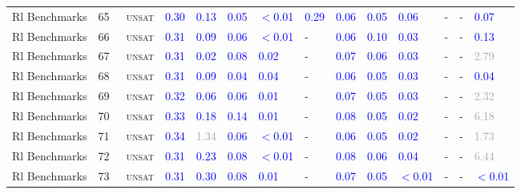 \begin{center}
{\begin{longtable}{@{}llllllllllllll@{}}
Rl Benchmarks & 65 & ~\textsc{unsat} & \textcolor{blue}{0.30} & \textcolor{blue}{0.13} & \textcolor{blue}{0.05} & \textcolor{blue}{$<$0.01} & \textcolor{blue}{0.29} & \textcolor{blue}{0.06} & \textcolor{blue}{0.05} & \textcolor{blue}{0.06} & - & - & \textcolor{blue}{0.07} \\
Rl Benchmarks & 66 & ~\textsc{unsat} & \textcolor{blue}{0.31} & \textcolor{blue}{0.09} & \textcolor{blue}{0.06} & \textcolor{blue}{$<$0.01} & - & \textcolor{blue}{0.06} & \textcolor{blue}{0.10} & \textcolor{blue}{0.03} & - & - & \textcolor{blue}{0.13} \\
Rl Benchmarks & 67 & ~\textsc{unsat} & \textcolor{blue}{0.31} & \textcolor{blue}{0.02} & \textcolor{blue}{0.08} & \textcolor{blue}{0.02} & - & \textcolor{blue}{0.07} & \textcolor{blue}{0.06} & \textcolor{blue}{0.03} & - & - & \textcolor{darkgray}{2.79} \\
Rl Benchmarks & 68 & ~\textsc{unsat} & \textcolor{blue}{0.31} & \textcolor{blue}{0.09} & \textcolor{blue}{0.04} & \textcolor{blue}{0.04} & - & \textcolor{blue}{0.06} & \textcolor{blue}{0.05} & \textcolor{blue}{0.03} & - & - & \textcolor{blue}{0.04} \\
Rl Benchmarks & 69 & ~\textsc{unsat} & \textcolor{blue}{0.32} & \textcolor{blue}{0.06} & \textcolor{blue}{0.06} & \textcolor{blue}{0.01} & - & \textcolor{blue}{0.07} & \textcolor{blue}{0.05} & \textcolor{blue}{0.03} & - & - & \textcolor{darkgray}{2.32} \\
Rl Benchmarks & 70 & ~\textsc{unsat} & \textcolor{blue}{0.33} & \textcolor{blue}{0.18} & \textcolor{blue}{0.14} & \textcolor{blue}{0.01} & - & \textcolor{blue}{0.08} & \textcolor{blue}{0.05} & \textcolor{blue}{0.02} & - & - & \textcolor{darkgray}{6.18} \\
Rl Benchmarks & 71 & ~\textsc{unsat} & \textcolor{blue}{0.34} & \textcolor{darkgray}{1.34} & \textcolor{blue}{0.06} & \textcolor{blue}{$<$0.01} & - & \textcolor{blue}{0.06} & \textcolor{blue}{0.05} & \textcolor{blue}{0.02} & - & - & \textcolor{darkgray}{1.73} \\
Rl Benchmarks & 72 & ~\textsc{unsat} & \textcolor{blue}{0.31} & \textcolor{blue}{0.23} & \textcolor{blue}{0.08} & \textcolor{blue}{$<$0.01} & - & \textcolor{blue}{0.08} & \textcolor{blue}{0.06} & \textcolor{blue}{0.04} & - & - & \textcolor{darkgray}{6.44} \\
Rl Benchmarks & 73 & ~\textsc{unsat} & \textcolor{blue}{0.31} & \textcolor{blue}{0.30} & \textcolor{blue}{0.08} & \textcolor{blue}{0.01} & - & \textcolor{blue}{0.07} & \textcolor{blue}{0.05} & \textcolor{blue}{$<$0.01} & - & - & \textcolor{blue}{$<$0.01} \\

\end{longtable}}
\end{center}

